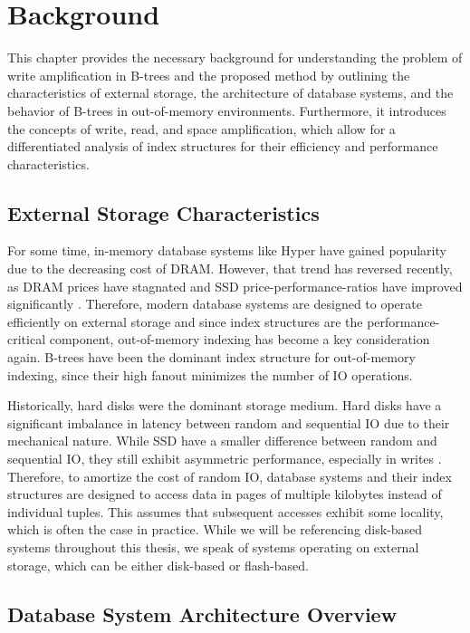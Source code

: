 \chapter{Background}
This chapter provides the necessary background for understanding the problem of write amplification in B-trees and the proposed method by outlining the characteristics of external storage, the architecture of database systems, and the behavior of B-trees in out-of-memory environments. 
Furthermore, it introduces the concepts of write, read, and space amplification, which allow for a differentiated analysis of index structures for their efficiency and performance characteristics.

\section{External Storage Characteristics}
For some time, in-memory database systems like Hyper \cite{kemper2011hyper} have gained popularity due to the decreasing cost of \ac{DRAM}.
However, that trend has reversed recently, as \ac{DRAM} prices have stagnated \cite{haas2023modern} and \ac{SSD} price-performance-ratios have improved significantly \cite{leis2024leanstore}.
Therefore, modern database systems are designed to operate efficiently on external storage and since index structures are the performance-critical component, out-of-memory indexing has become a key consideration again.
B-trees have been the dominant index structure for out-of-memory indexing, since their high fanout minimizes the number of \ac{IO} operations.

Historically, hard disks were the dominant storage medium.
Hard disks have a significant imbalance in latency between random and sequential \ac{IO} due to their mechanical nature.
While \ac{SSD} have a smaller difference between random and sequential \ac{IO}, they still exhibit asymmetric performance, especially in writes \cite{haas2023modern}.
Therefore, to amortize the cost of random \ac{IO}, database systems and their index structures are designed to access data in pages of multiple kilobytes instead of individual tuples.
This assumes that subsequent accesses exhibit some locality, which is often the case in practice.
While we will be referencing disk-based systems throughout this thesis, we speak of systems operating on external storage, which can be either disk-based or flash-based.

\section{Database System Architecture Overview}

